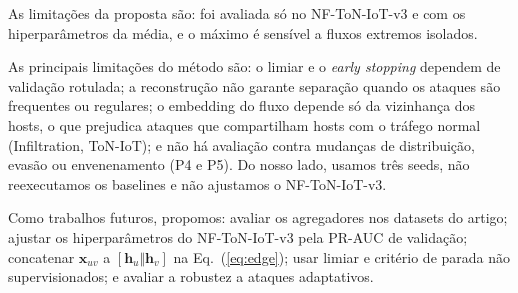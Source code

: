 \documentclass[conference]{IEEEtran}
\newcommand{\vect}[1]{\mathbf{#1}}
\begin{document}
As limitações da proposta são: foi avaliada só no NF-ToN-IoT-v3 e com os
hiperparâmetros da média, e o máximo é sensível a fluxos extremos isolados.

As principais limitações do método são: o limiar e o \emph{early stopping}
dependem de validação rotulada; a reconstrução não garante separação quando os
ataques são frequentes ou regulares; o embedding do fluxo depende só da
vizinhança dos hosts, o que prejudica ataques que compartilham hosts com o
tráfego normal (Infiltration, ToN-IoT); e não há avaliação contra mudanças de
distribuição, evasão ou envenenamento (P4 e P5). Do nosso lado, usamos três
seeds, não reexecutamos os baselines e não ajustamos o NF-ToN-IoT-v3.

Como trabalhos futuros, propomos: avaliar os agregadores nos datasets do artigo;
ajustar os hiperparâmetros do NF-ToN-IoT-v3 pela PR-AUC de validação; concatenar $\vect{x}_{uv}$ a
$[\vect{h}_u\Vert\vect{h}_v]$ na Eq.~(\ref{eq:edge}); usar limiar e critério de
parada não supervisionados; e avaliar a robustez a ataques adaptativos.



\end{document}
